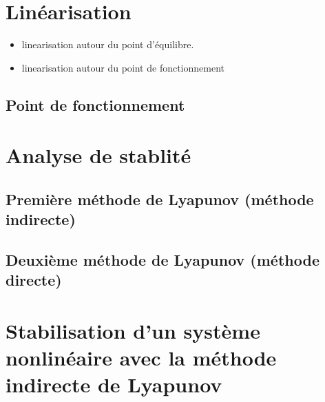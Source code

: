 \section{Linéarisation}
\begin{itemize}
	\item linearisation autour du point d'équilibre.
	\item linearisation autour du point de fonctionnement
\end{itemize}
\subsection{Point de fonctionnement}
\section{Analyse de stablité}\label{sec:stability analysis}
\subsection{Première méthode de Lyapunov (méthode indirecte)}
\subsection{Deuxième méthode de Lyapunov (méthode directe)}
\section{Stabilisation d'un système nonlinéaire avec la méthode indirecte de Lyapunov}